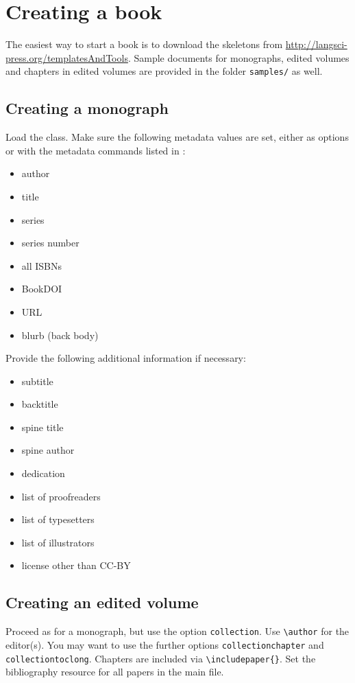 \documentclass[%
modfonts,
output=guidelines,
guidelines]{langscibook}
\begin{document}
\chapter{Creating a book}
The easiest way to start a book is to download the skeletons from \url{http://langsci-press.org/templatesAndTools}. Sample documents for monographs, edited volumes and chapters in edited volumes are provided in the folder \texttt{samples/} as well. 

\section{Creating a monograph}
Load the class. Make sure the following metadata values are set, either as options or with the metadata commands listed in :

\begin{itemize}
 \item author 
 \item title
 \item series 
 \item series number
 \item all ISBNs
 \item BookDOI
 \item URL
 \item blurb (back body)
\end{itemize}

Provide the following additional information if necessary:
\begin{itemize}
 \item subtitle
 \item backtitle
 \item spine title 
 \item spine author
 \item dedication 
 \item list of proofreaders 
 \item list of typesetters
 \item list of illustrators 
 \item license other than CC-BY
\end{itemize}

 
\section{Creating an edited volume}
Proceed as for a monograph, but use the option \texttt{collection}. Use \verb+\author+ for the editor(s). You may want to use the further options \texttt{collectionchapter} and \texttt{collectiontoclong}. Chapters are included via \verb+\includepaper{}+. Set the bibliography resource for all papers in the main file. 
\end{document}
